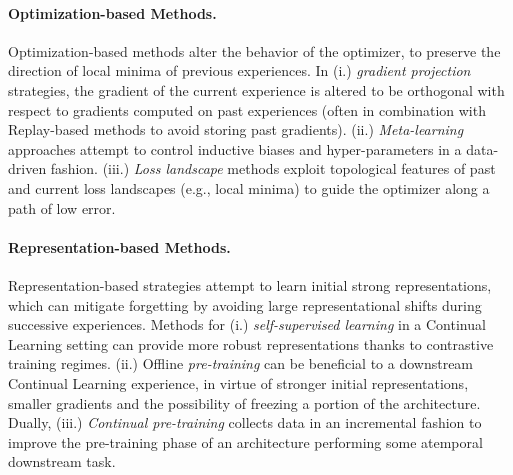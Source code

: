 \paragraph{Optimization-based Methods.} Optimization-based methods alter the behavior of the optimizer, to preserve the direction of local minima of previous experiences.
In (i.) \textit{gradient projection} strategies, the gradient of the current experience is altered to be orthogonal with respect to gradients computed on past experiences (often in combination with Replay-based methods to avoid storing past gradients). (ii.) \textit{Meta-learning} approaches attempt to control inductive biases and hyper-parameters in a data-driven fashion. (iii.) \textit{Loss landscape} methods exploit topological features of past and current loss landscapes (e.g., local minima) to guide the optimizer along a path of low error.

\paragraph{Representation-based Methods.} Representation-based strategies attempt to learn initial strong representations, which can mitigate forgetting by avoiding large representational shifts during successive experiences. Methods for (i.) \textit{self-supervised learning} in a Continual Learning setting can provide more robust representations thanks to contrastive training regimes. (ii.) Offline \textit{pre-training} can be beneficial to a downstream Continual Learning experience, in virtue of stronger initial representations, smaller gradients and the possibility of freezing a portion of the architecture. Dually, (iii.) \textit{Continual pre-training} collects data in an incremental fashion to improve the pre-training phase of an architecture performing some atemporal downstream task.


